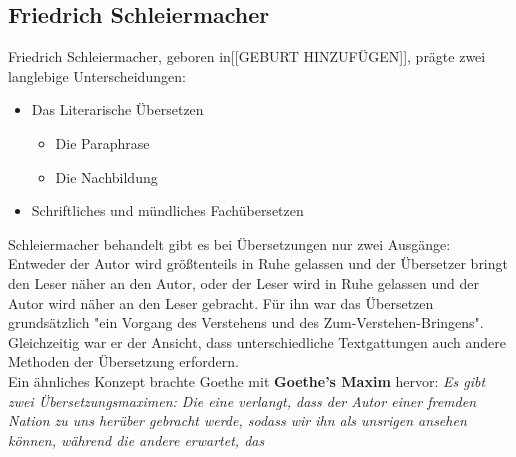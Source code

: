 \documentclass{article}
\begin{document}
	\subsection{Friedrich Schleiermacher}
	Friedrich Schleiermacher, geboren in[[GEBURT HINZUFÜGEN]], prägte zwei langlebige Unterscheidungen:
	\begin{itemize}
		\item{Das Literarische Übersetzen}
		\begin{itemize}
		\item{Die Paraphrase}
		\item{Die Nachbildung}
		\end{itemize}
		\item{Schriftliches und mündliches Fachübersetzen}
	\end{itemize}
	Schleiermacher behandelt gibt es bei Übersetzungen nur zwei Ausgänge: Entweder der Autor wird größtenteils in Ruhe gelassen und der Übersetzer bringt den Leser näher an den Autor, oder der Leser wird in Ruhe gelassen und der Autor wird näher an den Leser gebracht. Für ihn war das Übersetzen grundsätzlich "ein Vorgang des Verstehens und des Zum-Verstehen-Bringens". \\
	Gleichzeitig war er der Ansicht, dass unterschiedliche Textgattungen auch andere Methoden der Übersetzung erfordern. \\
	Ein ähnliches Konzept brachte Goethe mit \textbf{Goethe's Maxim} hervor: \textit{Es gibt zwei Übersetzungsmaximen: Die eine verlangt, dass der Autor einer fremden Nation zu uns herüber gebracht werde, sodass wir ihn als unsrigen ansehen können, während die andere erwartet, das}
\end{document}
